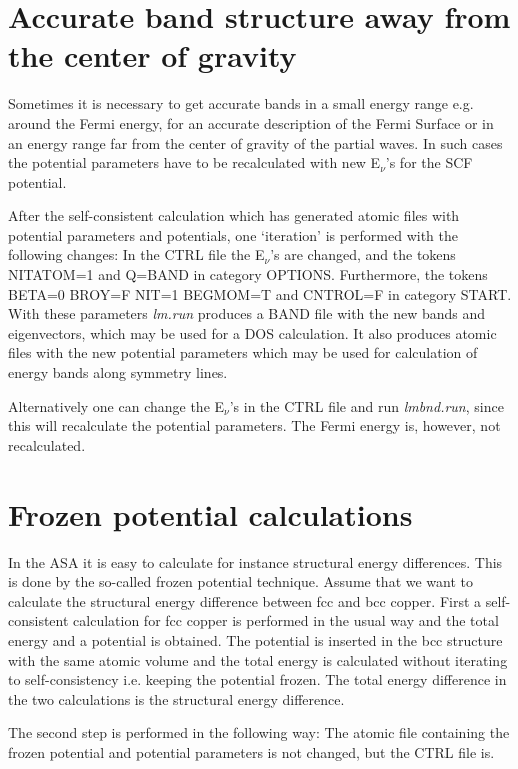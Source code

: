 \documentclass[aps,twocolumn,a4]{revtex4}
\begin{document}
%
\section{Accurate band structure away from the center of gravity}
\label{window}

Sometimes it is necessary to get accurate bands in a small energy range
e.g. around the Fermi energy, for an accurate description of the Fermi
Surface or in an energy range far from the center of gravity of the
partial waves.  In such cases the potential parameters have to be
recalculated with new E$_\nu $'s for the SCF potential.

After the self-consistent calculation which has generated atomic files
with potential parameters and potentials, one `iteration' is performed
with the following changes: In the CTRL file the E$_\nu $'s are
changed, and the tokens
NITATOM=1 and Q=BAND in category OPTIONS.  Furthermore, the tokens
BETA=0 BROY=F NIT=1 BEGMOM=T and CNTROL=F in category START.  With
these parameters {\em lm.run}
produces a BAND file with the new bands and eigenvectors, which may be
used for a DOS calculation.  It also produces atomic files with the new
potential parameters which may be used for calculation of energy bands
along symmetry lines.

Alternatively one can change the E$_\nu $'s in the CTRL file and run
{\em lmbnd.run}, since this will recalculate the potential parameters.
The Fermi energy is, however, not recalculated.

%
\section{Frozen potential calculations}
\label{frozen}

In the ASA it is easy to calculate for instance structural energy
differences. This is done by the so-called frozen potential technique.
Assume that we want to calculate the structural energy difference
between fcc and bcc copper. First a self-consistent calculation for
fcc copper is performed in the usual way and the total energy and a
potential is obtained. The potential is inserted in the bcc structure
with the same atomic volume and the total energy is calculated without
iterating to self-consistency i.e. keeping the potential frozen. The
total energy difference in the two calculations is the structural
energy difference.

The second step is performed in the following way: The atomic file
containing the frozen potential and potential parameters is not changed,
but the CTRL file is.
\end{document}
